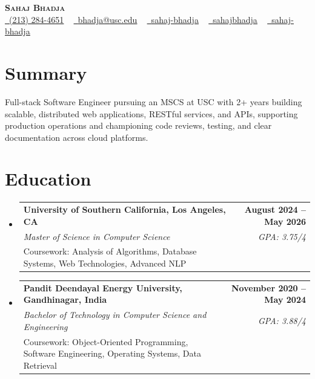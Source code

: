 \documentclass[letterpaper,10pt]{article}
\makeatletter
\newcommand{\resumeEduSubheading}[5]{\vspace{-1pt}\item\begin{tabular*}{1.0\textwidth}[t]{l@{\extracolsep{\fill}}r}\textbf{#1} & \textbf{\small #2} \\\textit{\small #3} & \textit{\small #4} \\\small #5 & \\\end{tabular*}\vspace{-4pt}}
\newcommand{\resumeSubHeadingListStart}{\begin{itemize}[leftmargin=0.0in, label={}]}
\newcommand{\resumeSubHeadingListEnd}{\end{itemize}}
\makeatother
\begin{document}
\begin{center}
{\Huge \scshape \textbf{Sahaj Bhadja}} \\ \vspace{1pt}
\small \href{tel:(213) 284-4651}{\faPhone\ \underline{(213) 284-4651}} ~ \href{mailto: bhadja@usc.edu}{\raisebox{-0.2\height}\faEnvelope\ \underline{bhadja@usc.edu}} ~
\href{https://www.linkedin.com/in/sahaj-bhadja/}{\raisebox{-0.2\height}\faLinkedin\ \underline{sahaj-bhadja}} ~ \href{https://github.com/SAHAJ-BHADJA}{\raisebox{-0.2\height}\faGithub\ \underline{sahajbhadja}} ~
\href{https://sahaj-bhadja.vercel.app/}{\raisebox{-0.2\height}\faGlobe\ \underline{sahaj-bhadja}}
\end{center}
\vspace{-16pt}
\section{Summary}
\begin{itemize}[leftmargin=0.15in, label={}]
\small{\item{Full-stack Software Engineer pursuing an MSCS at USC with 2+ years building scalable, distributed web applications, RESTful services, and APIs, supporting production operations and championing code reviews, testing, and clear documentation across cloud platforms.}}
\end{itemize}
\vspace{-6pt}
\section{Education}
\resumeSubHeadingListStart
\resumeEduSubheading{University of Southern California, Los Angeles, CA}{August 2024 -- May 2026}{Master of Science in Computer Science}{GPA: 3.75/4}{Coursework: Analysis of Algorithms, Database Systems, Web Technologies, Advanced NLP}
\vspace{-9pt}
\resumeEduSubheading{Pandit Deendayal Energy University, Gandhinagar, India}{November 2020 -- May 2024}{Bachelor of Technology in Computer Science and Engineering}{GPA: 3.88/4}{Coursework: Object-Oriented Programming, Software Engineering, Operating Systems, Data Retrieval}
\resumeSubHeadingListEnd
\vspace{-6pt}
\end{document}

